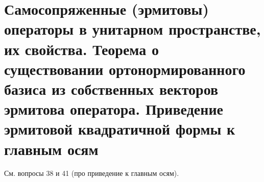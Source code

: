 \section{Самосопряженные (эрмитовы) операторы в унитарном пространстве, их свойства. Теорема о существовании ортонормированного базиса из собственных векторов эрмитова оператора. Приведение эрмитовой квадратичной формы к главным осям}

См. вопросы 38 и 41 (про приведение к главным осям).

